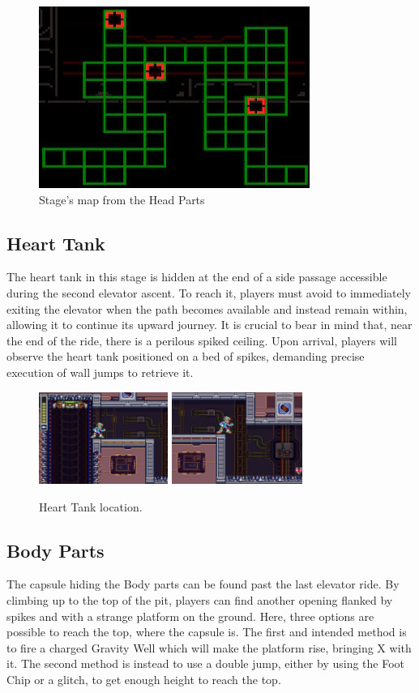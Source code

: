\begin{figure}[htp]
	\centering
	\includegraphics[width=.5\linewidth]{figures/X3/Volt_catfish/map.jpg}
	\caption{Stage's map from the Head Parts}
	\label{fig:Power_control_map}
\end{figure}

\subsection{Heart Tank}
The heart tank in this stage is hidden at the end of a side passage accessible during the second elevator ascent. To reach it, players must avoid to immediately exiting the elevator when the path becomes available and instead remain within, allowing it to continue its upward journey. It is crucial to bear in mind that, near the end of the ride, there is a perilous spiked ceiling. Upon arrival, players will observe the heart tank positioned on a bed of spikes, demanding precise execution of wall jumps to retrieve it.

\begin{figure}[htp]
	\centering
	\includegraphics[height=3cm]{figures/X3/Volt_catfish/heart_1.jpg}
	\includegraphics[height=3cm]{figures/X3/Volt_catfish/heart_2.jpg}
	\caption{Heart Tank location.}
\end{figure}

\subsection{Body Parts}
The capsule hiding the Body parts can be found past the last elevator ride. By climbing up to the top of the pit, players can find another opening flanked by spikes and with a strange platform on the ground. Here, three options are possible to reach the top, where the capsule is. The first and intended method is to fire a charged Gravity Well  which will make the platform rise, bringing X with it. The second method is instead to use a double jump, either by using the Foot Chip or a glitch, to get enough height to reach the top. 

